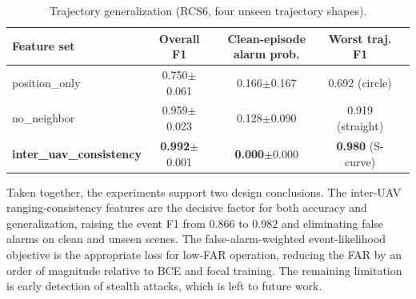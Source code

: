 \begin{table}[htbp]
  \centering
  \caption{Trajectory generalization (RCS6, four unseen trajectory shapes).}
  \label{tab:trajectory}
  \begin{tabular}{lcccc}
    \toprule
    Feature set & Overall F1 & Clean-episode alarm prob. & Worst traj. F1 \\
    \midrule
    position\_only           & 0.750$\pm$0.061 & 0.166$\pm$0.167 & 0.692 (circle) \\
    no\_neighbor             & 0.959$\pm$0.023 & 0.128$\pm$0.090 & 0.919 (straight) \\
    \textbf{inter\_uav\_consistency} & \textbf{0.992}$\pm$0.001
      & \textbf{0.000}$\pm$0.000 & \textbf{0.980} (S-curve) \\
    \bottomrule
  \end{tabular}
\end{table}

Taken together, the experiments support two design conclusions. The inter-UAV
ranging-consistency features are the decisive factor for both accuracy and
generalization, raising the event F1 from $0.866$ to $0.982$ and eliminating
false alarms on clean and unseen scenes. The false-alarm-weighted
event-likelihood objective is the appropriate loss for low-FAR operation,
reducing the FAR by an order of magnitude relative to BCE and focal
training. The remaining limitation is early detection of stealth attacks,
which is left to future work.

